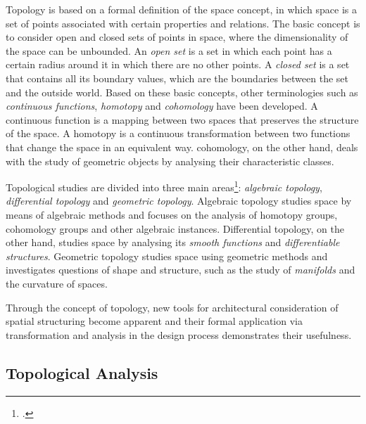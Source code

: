 \documentclass[a4paper, 12pt]{report}
\begin{document}
Topology is based on a formal definition of the space concept, in which space is a set of points associated with certain properties and relations. The basic concept is to consider open and closed sets of points in space, where the dimensionality of the space can be unbounded. An \textit{open set} is a set in which each point has a certain radius around it in which there are no other points. A \textit{closed set} is a set that contains all its boundary values, which are the boundaries between the set and the outside world. Based on these basic concepts, other terminologies such as \textit{\glspl{continuous function}}, \textit{\gls{homotopy}} and \textit{\gls{cohomology}} have been developed. A \gls{continuous function} is a mapping between two spaces that preserves the structure of the space. A \gls{homotopy} is a continuous transformation between two functions that change the space in an equivalent way. \Gls{cohomology}, on the other hand, deals with the study of geometric objects by analysing their characteristic classes.

Topological studies are divided into three main areas\footcite{kelley1955general}: \textit{algebraic topology}, \textit{differential topology} and \textit{geometric topology}. Algebraic topology studies space by means of algebraic methods and focuses on the analysis of \gls{homotopy} groups, \gls{cohomology} groups and other algebraic instances. Differential topology, on the other hand, studies space by analysing its \textit{smooth functions} and \textit{differentiable structures}. Geometric topology studies space using geometric methods and investigates questions of shape and structure, such as the study of \textit{\glspl{manifold}} and the curvature of spaces.

Through the concept of topology, new tools for architectural consideration of spatial structuring become apparent and their formal application via transformation and analysis in the design process demonstrates their usefulness.

\subsection{Topological Analysis}\label{subsec:topological-analysis}
\end{document}
